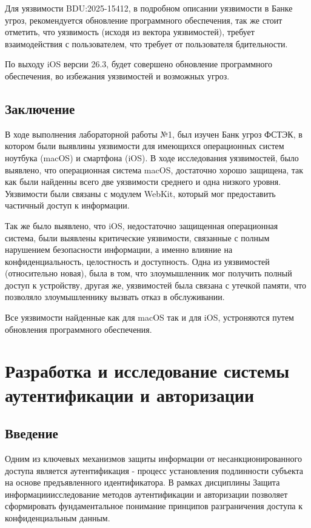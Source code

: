 \documentclass[areasetadvanced]{scrartcl}
\begin{document}
Для уязвимости BDU:2025-15412, в подробном описании уязвимости в Банке угроз\cite{bdu}, рекомендуется обновление программного обеспечения, 
так же стоит отметить, что уязвимость (исходя из вектора уязвимостей), требует взаимодействия с пользователем, что требует от пользователя 
бдительности. 

По выходу iOS версии 26.3, будет совершено обновление программного обеспечения, во избежания уязвимостей и возможных угроз.

\subsection*{Заключение}
В ходе выполнения лабораторной работы №1, был изучен Банк угроз ФСТЭК\cite{bdu}, в котором были выявлины уязвимости для имеющихся операционных систем ноутбука (macOS) и смартфона (iOS). 
В ходе исследования уязвимостей, было выявлено, что операционная система macOS, достаточно хорошо защищена, так как были найденны всего две уязвимости среднего и одна низкого уровня. 
Уязвимости были связаны с модулем WebKit, который мог предоставить частичный доступ к информации. 

Так же было выявлено, что iOS, недостаточно защищенная операционная система, были выявлены критические уязвимости, связанные с полным нарушением безопасности информации, а именно влияние на конфиденциальность, целостность и доступность.
Одна из уязвимостей (относительно новая), была в том, что злоумышленник мог получить полный доступ к устройству, другая же, уязвимостей была связана с утечкой памяти, что позволяло злоумышленнику вызвать отказ в обслуживании.

Все уязвимости найденные как для macOS так и для iOS, устроняются путем обновления программного обеспечения.

\newpage
\section{Разработка и исследование системы аутентификации и авторизации}
\subsection{Введение}
Одним из ключевых механизмов защиты информации от несанкционированного доступа является аутентификация - процесс установления подлинности субъекта на основе предъявленного идентификатора.
В рамках дисциплины \guillemetleft Защита информации\guillemetright исследование методов аутентификации и авторизации позволяет сформировать фундаментальное понимание принципов разграничения доступа к конфиденциальным данным.
\end{document}
